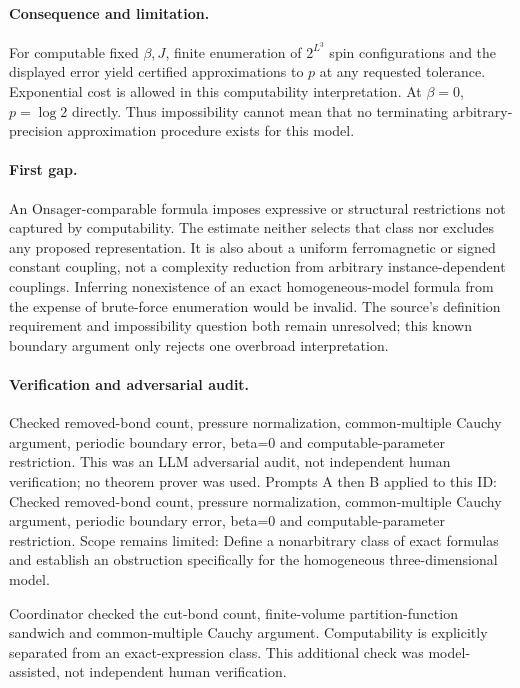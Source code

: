 \documentclass[11pt]{article}
\begin{document}
\paragraph{Consequence and limitation.}For computable fixed \(\beta,J\), finite enumeration of \(2^{L^3}\) spin configurations and the displayed error yield certified approximations to \(p\) at any requested tolerance. Exponential cost is allowed in this computability interpretation. At \(\beta=0\), \(p=\log2\) directly. Thus impossibility cannot mean that no terminating arbitrary-precision approximation procedure exists for this model.
\paragraph{First gap.}An Onsager-comparable formula imposes expressive or structural restrictions not captured by computability. The estimate neither selects that class nor excludes any proposed representation. It is also about a uniform ferromagnetic or signed constant coupling, not a complexity reduction from arbitrary instance-dependent couplings. Inferring nonexistence of an exact homogeneous-model formula from the expense of brute-force enumeration would be invalid. The source's definition requirement and impossibility question both remain unresolved; this known boundary argument only rejects one overbroad interpretation.

\paragraph{Verification and adversarial audit.}
Checked removed-bond count, pressure normalization, common-multiple Cauchy argument, periodic boundary error, beta=0 and computable-parameter restriction. This was an LLM adversarial audit, not independent human verification; no theorem prover was used. Prompts A then B applied to this ID: Checked removed-bond count, pressure normalization, common-multiple Cauchy argument, periodic boundary error, beta=0 and computable-parameter restriction. Scope remains limited: Define a nonarbitrary class of exact formulas and establish an obstruction specifically for the homogeneous three-dimensional model.

Coordinator checked the cut-bond count, finite-volume partition-function sandwich and common-multiple Cauchy argument. Computability is explicitly separated from an exact-expression class. This additional check was model-assisted, not independent human verification.
\end{document}
